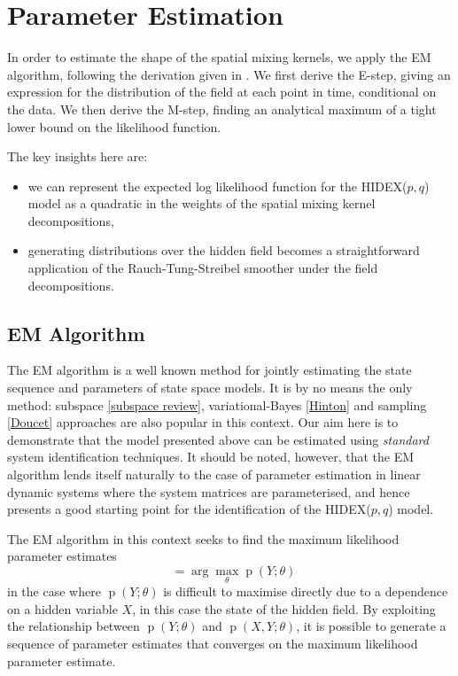 \documentclass{IEEEtran}
\DeclareMathOperator{\p}{p}
\DeclareMathOperator{\thetaML}{\theta_{\mathrm{ML}}}
\begin{document}
\section{Parameter Estimation}
\label{sec:estimation}

In order to estimate the shape of the spatial mixing kernels, we apply the EM algorithm, following the derivation given in \cite{GibsonNinness}. We first derive the E-step, giving an expression for the distribution of the field at each point in time, conditional on the data. We then derive the M-step, finding an analytical maximum of a tight lower bound on the likelihood function.

The key insights here are:
\begin{itemize}
	\item we can represent the expected log likelihood function for the HIDEX($p,q$) model as a quadratic in the weights of the spatial mixing kernel decompositions,
	\item generating distributions over the hidden field becomes a straightforward application of the Rauch-Tung-Streibel smoother \cite{Rauch} under the field decompositions.
\end{itemize} 

\subsection{EM Algorithm}

The EM algorithm is a well known method for jointly estimating the state sequence and parameters of state space models. It is by no means the only method: subspace \ref{subspace review}, variational-Bayes \ref{Hinton} and sampling \ref{Doucet} approaches are also popular in this context. Our aim here is to demonstrate that the model presented above can be estimated using \emph{standard} system identification techniques. It should be noted, however, that the EM algorithm lends itself naturally to the case of parameter estimation in linear dynamic systems where the system matrices are parameterised, and hence presents a good starting point for the identification of the HIDEX($p,q$) model.

The EM algorithm in this context seeks to find the maximum likelihood parameter estimates 
\begin{equation}
\thetaML=\arg\max_{\theta} \p (Y ; \theta)
\end{equation}
in the case where $\p(Y;\theta)$ is difficult to maximise directly due to a dependence on a hidden variable $X$, in this case the state of the hidden field. By exploiting the relationship between $\p(Y; \theta)$ and $\p(X,Y; \theta)$, it is possible to generate a sequence of parameter estimates that converges on the maximum likelihood parameter estimate.
\end{document}
